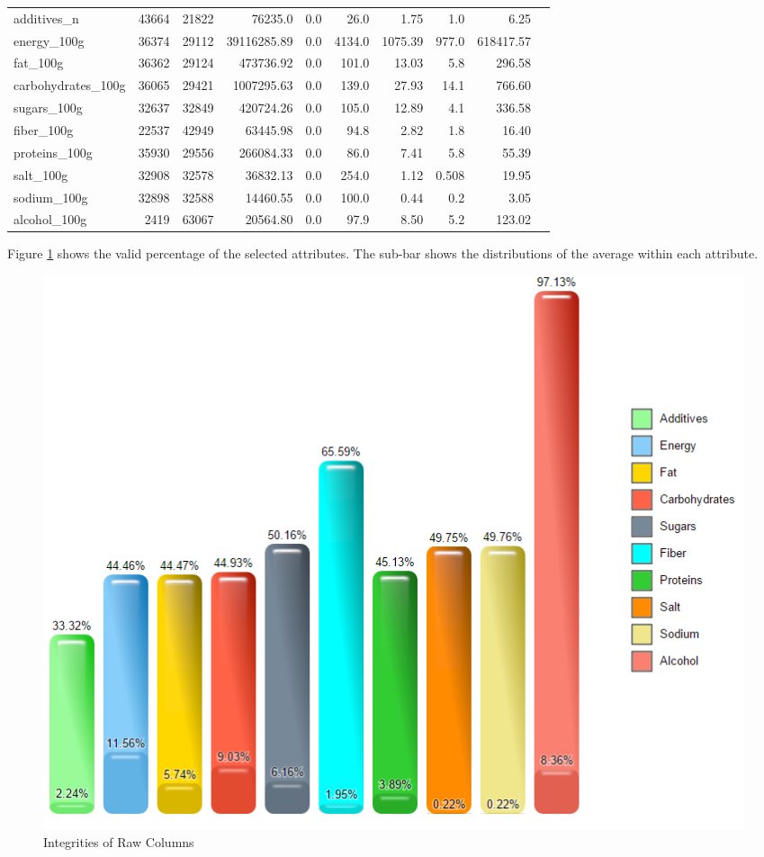 \documentclass[11pt]{article}
\begin{document}
\begin{center}
\begin{longtable}{|l|r|r|r|r|r|r|r|r|r|}
additives\_n & 43664 & 21822 & 76235.0 & 0.0 & 26.0 & 1.75 & 1.0 & 6.25 \\
energy\_100g & 36374 & 29112 & 39116285.89 & 0.0 & 4134.0 & 1075.39 & 977.0 & 618417.57 \\
fat\_100g & 36362 & 29124 & 473736.92 & 0.0 & 101.0 & 13.03 & 5.8 & 296.58 \\
carbohydrates\_100g & 36065 & 29421 & 1007295.63 & 0.0 & 139.0 & 27.93 & 14.1 & 766.60 \\
sugars\_100g & 32637 & 32849 & 420724.26 & 0.0 & 105.0 & 12.89 & 4.1 & 336.58 \\
fiber\_100g & 22537 & 42949 & 63445.98 & 0.0 & 94.8 & 2.82 & 1.8 & 16.40 \\
proteins\_100g & 35930 & 29556 & 266084.33 & 0.0 & 86.0 & 7.41 & 5.8 & 55.39 \\
salt\_100g & 32908 & 32578 & 36832.13 & 0.0 & 254.0 & 1.12 & 0.508 & 19.95 \\
sodium\_100g & 32898 & 32588 & 14460.55 & 0.0 & 100.0 & 0.44 & 0.2 & 3.05 \\
alcohol\_100g & 2419 & 63067 & 20564.80 & 0.0 & 97.9 & 8.50 & 5.2 & 123.02 \\

\hline

\end{longtable}
\end{center}

Figure \ref{fig:attributesValidityFigure} shows the valid percentage of the selected attributes. The sub-bar shows the distributions of the average within each attribute.

\begin{figure}[!htp]
\centering
\includegraphics[width=\textwidth]{../vis/selected.attributes.validity.png}
\caption{Integrities of Raw Columns}
\label{fig:attributesValidityFigure}
\end{figure}
\end{document}
